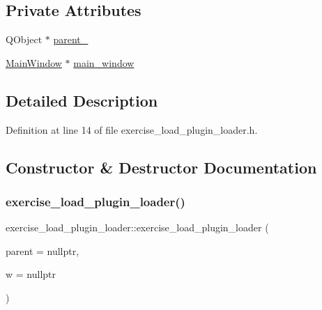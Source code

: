 \subsection*{Private Attributes}
\begin{DoxyCompactItemize}
\item 
Q\+Object $\ast$ \hyperlink{classexercise__load__plugin__loader_adba0ee3eb5d4ed08e25b302a0cd33afa}{parent\+\_\+}
\item 
\hyperlink{classMainWindow}{Main\+Window} $\ast$ \hyperlink{classexercise__load__plugin__loader_a94b804f5276c83ac1877a161d012df6d}{main\+\_\+window}
\end{DoxyCompactItemize}


\subsection{Detailed Description}


Definition at line 14 of file exercise\+\_\+load\+\_\+plugin\+\_\+loader.\+h.



\subsection{Constructor \& Destructor Documentation}
\mbox{\label{classexercise__load__plugin__loader_a1c0b6c3d02cae87b2ef013267f6c1c95}} 
\subsubsection{\texorpdfstring{exercise\+\_\+load\+\_\+plugin\+\_\+loader()}{exercise\_load\_plugin\_loader()}}
{\footnotesize\ttfamily exercise\+\_\+load\+\_\+plugin\+\_\+loader\+::exercise\+\_\+load\+\_\+plugin\+\_\+loader (\begin{DoxyParamCaption}\item[{Q\+Object $\ast$}]{parent = {\ttfamily nullptr},  }\item[{\hyperlink{classMainWindow}{Main\+Window} $\ast$}]{w = {\ttfamily nullptr} }\end{DoxyParamCaption})\hspace{0.3cm}{\ttfamily [explicit]}}



